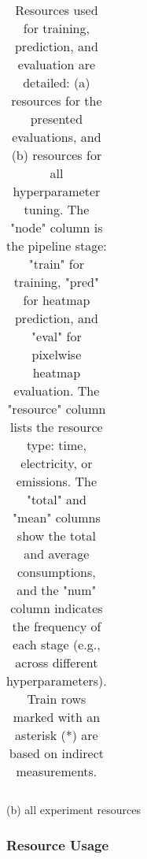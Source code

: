\documentclass[10pt,twocolumn,letterpaper]{article}
\newcommand{\cotwo}{\ensuremath{\mathrm{CO_2}}}
\begin{document}
\begin{table}[t]
\begin{tabular}{llllr}
\bottomrule
\end{tabular}
(b) all experiment resources
\caption[]{
Resources used for training, prediction, and evaluation are detailed:
(a) resources for the presented evaluations, and (b) resources for all hyperparameter tuning.
The "node" column is the pipeline stage:
"train" for training, "pred" for heatmap prediction, and "eval" for pixelwise heatmap evaluation.
The "resource" column lists the resource type: time, electricity, or emissions.
The "total" and "mean" columns show the total and average consumptions, and the "num" column indicates the
  frequency of each stage (e.g., across different hyperparameters).
Train rows marked with an asterisk (*) are based on indirect measurements.
}
\label{tab:resources}
\end{table}



\subsubsection{Resource Usage}
\end{document}
